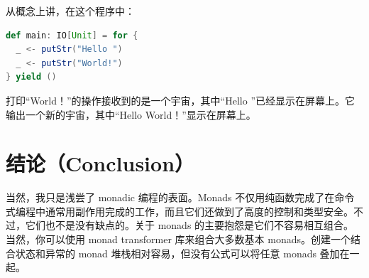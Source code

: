 从概念上讲，在这个程序中：

\begin{lstlisting}[language=Scala]
def main: IO[Unit] = for {
  _ <- putStr("Hello ")
  _ <- putStr("World!")
} yield ()
\end{lstlisting}
打印“World！”的操作接收到的是一个宇宙，其中“Hello ”已经显示在屏幕上。它输出一个新的宇宙，其中“Hello World！”显示在屏幕上。

\section{结论（Conclusion）}

当然，我只是浅尝了 monadic 编程的表面。Monads 不仅用纯函数完成了在命令式编程中通常用副作用完成的工作，而且它们还做到了高度的控制和类型安全。不过，它们也不是没有缺点的。关于 monads 的主要抱怨是它们不容易相互组合。当然，你可以使用 monad transformer 库来组合大多数基本 monads。创建一个结合状态和异常的 monad 堆栈相对容易，但没有公式可以将任意 monads 叠加在一起。
